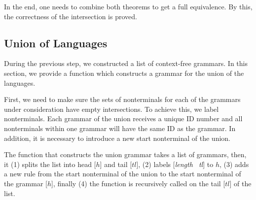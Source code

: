 %

In the end, one needs to combine both theorems to get a full equivalence. By this, the correctness of the intersection is proved.

\subsection{Union of Languages}

During the previous step, we constructed a list of context-free grammars. In this section, we provide a function which constructs a grammar for the union of the languages.

First, we need to make sure the sets of nonterminals for each of the grammars under consideration have empty intersections. To achieve this, we label nonterminals. Each grammar of the union receives a unique ID number and all nonterminals within one grammar will have the same ID as the grammar. In addition, it is necessary to introduce a new start nonterminal of the union.



The function that constructs the union grammar takes a list of grammars, then, it (1) splits the list into head [$h$] and tail [$tl$], (2) labels [\textit{length \ tl}] to $h$, (3) adds a new rule from the start nonterminal of the union to the start nonterminal of the grammar [$h$], finally (4) the function is recursively called on the tail [$tl$] of the list.

